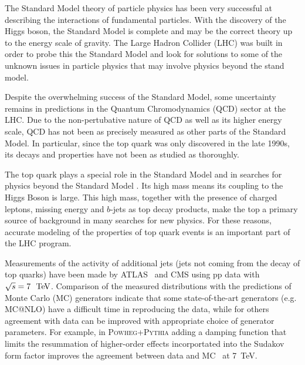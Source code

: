 The Standard Model theory of particle physics has been very successful at describing the interactions of fundamental particles. With the discovery of the Higgs boson, the Standard Model is complete and may be the correct theory up to the energy scale of gravity. The Large Hadron Collider (LHC) was built in order to probe this the Standard Model and look for solutions to some of the unknown issues in particle physics that may involve physics beyond the stand model.

Despite the overwhelming success of the Standard Model, some uncertainty remains in predictions in the Quantum Chromodynamics (QCD) sector at the LHC. Due to the non-pertubative nature of QCD as well as its higher energy scale, QCD has not been as precisely measured as other parts of the Standard Model. In particular, since the top quark was only discovered in the late 1990s, its decays and properties have not been as studied as thoroughly. 

The top quark plays a special role in the Standard Model and in searches for
physics beyond the Standard Model .  Its high mass means its coupling to the
Higgs Boson is large.  This high mass, together with the presence of 
charged leptons, missing energy and $b$-jets as top decay products,
make the top a primary source of background in many searches for new physics.
For these reasons, accurate modeling of the properties of top quark
events is an important part of the LHC program.

Measurements of the activity of additional jets (jets not coming from the decay of top quarks)
have been made by ATLAS~\cite{gapfraction,hdamp,ljets} and CMS\cite{Chatrchyan:2014gma} using
pp data with $\sqrt{s}=7~\TeV$.  Comparison of the measured distributions with the predictions of Monte Carlo (MC) generators
indicate that some state-of-the-art generators (e.g. \textsc{ MC@NLO}) have a difficult time in reproducing the data,
while for others  agreement with data can be improved with appropriate
choice of generator parameters.  For example, in \textsc{Powheg+Pythia} adding a damping
function that limits the resummation of higher-order effects incorportated into  the Sudakov form factor improves
the agreement between data and MC~\cite{hdamp} at 7~TeV.  

